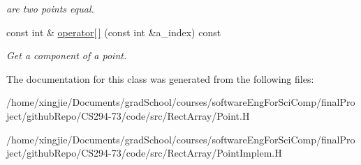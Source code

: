 \begin{DoxyCompactItemize}
\begin{DoxyCompactList}\small\item\em are two points equal. \end{DoxyCompactList}\item 
\hypertarget{classPoint_a88c0a9d6ac6824e141dce78941996edf}{}const int \& \hyperlink{classPoint_a88c0a9d6ac6824e141dce78941996edf}{operator\mbox{[}$\,$\mbox{]}} (const int \&a\+\_\+index) const \label{classPoint_a88c0a9d6ac6824e141dce78941996edf}

\begin{DoxyCompactList}\small\item\em Get a component of a point. \end{DoxyCompactList}\end{DoxyCompactItemize}


The documentation for this class was generated from the following files\+:\begin{DoxyCompactItemize}
\item 
/home/xingjie/\+Documents/grad\+School/courses/software\+Eng\+For\+Sci\+Comp/final\+Project/github\+Repo/\+C\+S294-\/73/code/src/\+Rect\+Array/Point.\+H\item 
/home/xingjie/\+Documents/grad\+School/courses/software\+Eng\+For\+Sci\+Comp/final\+Project/github\+Repo/\+C\+S294-\/73/code/src/\+Rect\+Array/Point\+Implem.\+H\end{DoxyCompactItemize}
